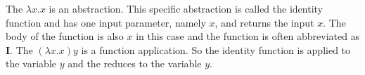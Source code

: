 The \lterm $\lambda x. x$ is an abstraction. This specific abstraction is called the identity function and has one input parameter, namely $x$, and returns the input $x$.
The body of the function is also $x$ in this case and the function is often abbreviated as $\mathbf{I}$. 
The \lterm $(\lambda x. x) y$ is a function application. So the identity function is applied to the variable $y$ and the \lterm reduces to the variable $y$.
